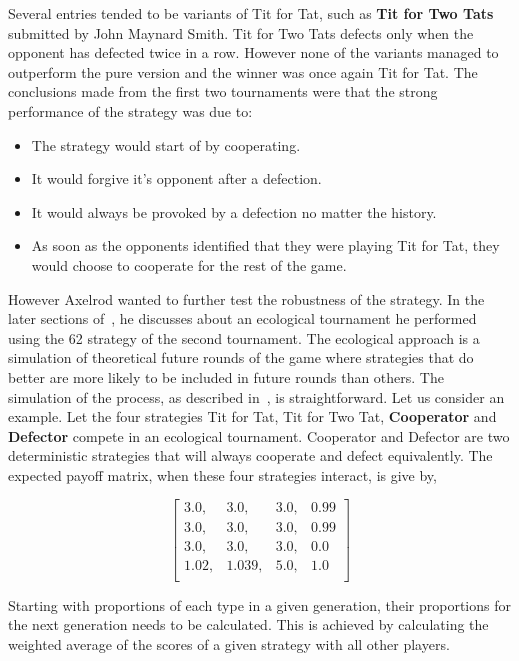 \documentclass{article}
\theoremstyle{definition}
\begin{document}
Several entries tended to be variants of Tit for Tat, such as
\textbf{Tit for Two Tats} submitted by John Maynard Smith. Tit for Two
Tats defects only when the opponent has defected twice in a row. However
none of the variants managed to outperform the pure version and the winner was once
again Tit for Tat. The conclusions made from the first two tournaments were that the strong
performance of the strategy was due to:

\begin{itemize}
    \item The strategy would start of by cooperating.
    \item It would forgive it's opponent after a defection.
    \item It would always be provoked by a defection no matter the history.
    \item As soon as the opponents identified that they were playing Tit for Tat,
    they would choose to cooperate for the rest of the game.
\end{itemize}

However Axelrod wanted to further test the robustness of the strategy. In the later
sections of~\cite{Axelrod1980b}, he discusses about an ecological tournament 
he performed using the 62 strategy of the second tournament. The ecological
approach is a simulation of theoretical future rounds of the game where strategies
that do better are more likely to be included in future rounds than others.
The simulation of the process, as described in~\cite{Axelrod1980b}, is straightforward.
Let us consider an example. Let the four strategies Tit for Tat, Tit for Two Tat,
\textbf{Cooperator} and \textbf{Defector} compete in an ecological tournament.
Cooperator and Defector are two deterministic strategies that will always cooperate
and defect equivalently. The expected payoff matrix, when these four strategies
interact, is give by,

\[\begin{bmatrix}
    3.0,  & 3.0,  & 3.0, & 0.99 \\
    3.0,  & 3.0,  & 3.0, & 0.99 \\
    3.0,  & 3.0,  & 3.0, & 0.0  \\
    1.02, & 1.039,& 5.0, & 1.0 \\
\end{bmatrix}\]

Starting with proportions of each type in a given generation, their proportions
for the next generation needs to be calculated. This is achieved by calculating
the weighted average of the scores of a given strategy with all other players.
\end{document}
